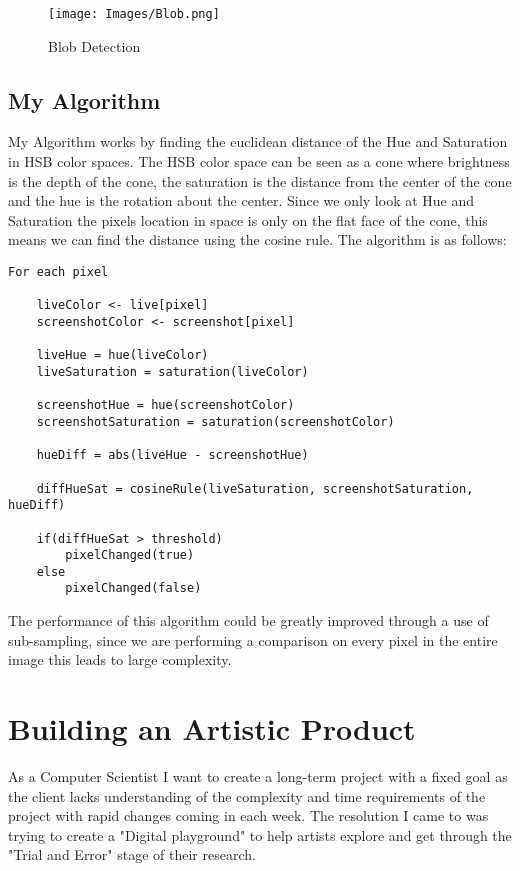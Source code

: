\documentclass[a4paper]{report}
\begin{document}
\begin{figure}[!ht]
\centering
\texttt{[image: Images/Blob.png]}
\caption{\label{fig:Doughnut} Blob Detection}
\end{figure}

\subsection{My Algorithm}
My Algorithm works by finding the euclidean distance of the Hue and Saturation in HSB color spaces. The HSB color space can be seen as a cone where brightness is the depth of the cone, the saturation is the distance from the center of the cone and the hue is the rotation about the center. Since we only look at Hue and Saturation the pixels location in space is only on the flat face of the cone, this means we can find the distance using the cosine rule. The algorithm is as follows:

\begin{lstlisting}
For each pixel

    liveColor <- live[pixel]
    screenshotColor <- screenshot[pixel]
    
    liveHue = hue(liveColor)
    liveSaturation = saturation(liveColor)
    
    screenshotHue = hue(screenshotColor)
    screenshotSaturation = saturation(screenshotColor)
    
    hueDiff = abs(liveHue - screenshotHue)
    
    diffHueSat = cosineRule(liveSaturation, screenshotSaturation, hueDiff)
    
    if(diffHueSat > threshold)
    	pixelChanged(true)
    else
    	pixelChanged(false)
\end{lstlisting}

The performance of this algorithm could be greatly improved through a use of sub-sampling, since we are performing a comparison on every pixel in the entire image this leads to large complexity. 
\section{Building an Artistic Product}
As a Computer Scientist I want to create a long-term project with a fixed goal as the client lacks understanding of the complexity and time requirements of the project with rapid changes coming in each week. The resolution I came to was trying to create a "Digital playground" to help artists explore and get through the "Trial and Error" stage of their research.
\end{document}
